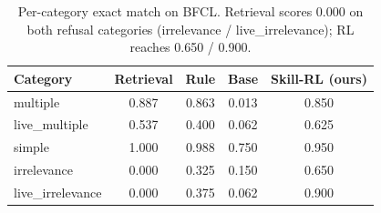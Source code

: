 
\begin{table}[t]
  \centering
  \caption{Per-category exact match on BFCL. Retrieval scores 0.000 on both refusal categories (irrelevance / live_irrelevance); RL reaches 0.650 / 0.900.}
  \label{tab:bfcl-cat}
  \begin{tabular}{lcccc}
    \toprule
    Category & Retrieval & Rule & Base & Skill-RL (ours) \\
    \midrule
    multiple & 0.887 & 0.863 & 0.013 & 0.850 \\
    live_multiple & 0.537 & 0.400 & 0.062 & 0.625 \\
    simple & 1.000 & 0.988 & 0.750 & 0.950 \\
    irrelevance & 0.000 & 0.325 & 0.150 & 0.650 \\
    live_irrelevance & 0.000 & 0.375 & 0.062 & 0.900 \\
    \bottomrule
  \end{tabular}
\end{table}
